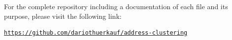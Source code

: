 \documentclass[12pt,a4paper,titlepage,oneside,english]{article}
\begin{document}
For the complete repository including a documentation of each file and its purpose, please visit the following link:

\texttt{\url{https://github.com/dariothuerkauf/address-clustering}}

%
%
%
\end{document}
